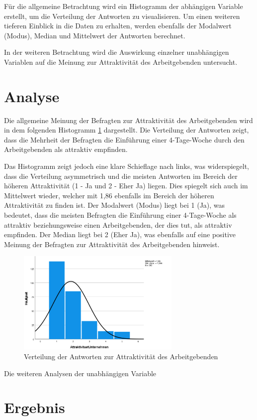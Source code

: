 Für die allgemeine Betrachtung wird ein Histogramm der abhängigen Variable erstellt, um die Verteilung 
der Antworten zu visualisieren. Um einen weiteren tieferen Einblick in die Daten zu erhalten, werden 
ebenfalls der Modalwert (Modus), Median und Mittelwert der Antworten berechnet.

In der weiteren Betrachtung wird die Auswirkung einzelner unabhängigen Variablen auf die Meinung zur 
Attraktivität des Arbeitgebenden untersucht.

\section{Analyse}

Die allgemeine Meinung der Befragten zur Attraktivität des Arbeitgebenden wird in dem folgenden Histogramm 
\ref{fig:attraktivitaet_verteilung} dargestellt. Die Verteilung der Antworten zeigt, dass die Mehrheit der
Befragten die Einführung einer 4-Tage-Woche durch den Arbeitgebenden als attraktiv empfinden.

Das Histogramm zeigt jedoch eine klare Schieflage nach links, was widerspiegelt, dass die Verteilung 
asymmetrisch und die meisten Antworten im Bereich der höheren Attraktivität (1 - Ja und 2 - Eher Ja) liegen. 
Dies spiegelt sich auch im Mittelwert wieder, welcher mit 1,86 ebenfalls im Bereich der höheren Attraktivität
zu finden ist. Der Modalwert (Modus) liegt bei 1 (Ja), was bedeutet, dass die meisten Befragten die Einführung einer 
4-Tage-Woche als attraktiv beziehungsweise einen Arbeitgebenden, der dies tut, als attraktiv empfinden. Der Median
liegt bei 2 (Eher Ja), was ebenfalls auf eine positive Meinung der Befragten zur Attraktivität des Arbeitgebenden
hinweist.


\begin{figure}[h]
    \centering
    \includegraphics[width=0.7\textwidth]{04_Artefakte/01_Abbildungen/hypothese_5/attraktivitaet_histogram.png}
    \caption{Verteilung der Antworten zur Attraktivität des Arbeitgebenden}
    \label{fig:attraktivitaet_verteilung}
\end{figure}

Die weiteren Analysen der unabhängigen Variable 



\section{Ergebnis}